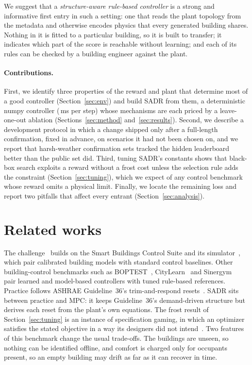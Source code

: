 \documentclass{article}
\begin{document}
We suggest that a \emph{structure-aware rule-based controller} is a strong and informative first entry in such a setting: one that reads the plant topology from the metadata and otherwise encodes physics that every generated building shares. Nothing in it is fitted to a particular building, so it is built to transfer; it indicates which part of the score is reachable without learning; and each of its rules can be checked by a building engineer against the plant.

\paragraph{Contributions.} First, we identify three properties of the reward and plant that determine most of a good controller (Section~\ref{sec:env}) and build SADR from them, a deterministic numpy controller (\PolicyMsOurs{}\,ms per step) whose mechanisms are each priced by a leave-one-out ablation (Sections~\ref{sec:method} and~\ref{sec:results}). Second, we describe a development protocol in which a change shipped only after a full-length confirmation, fixed in advance, on scenarios it had not been chosen on, and we report that harsh-weather confirmation sets tracked the hidden leaderboard better than the public set did. Third, tuning SADR's constants shows that black-box search exploits a reward without a frost cost unless the selection rule adds the constraint (Section~\ref{sec:tuning}), which we expect of any control benchmark whose reward omits a physical limit. Finally, we locate the remaining loss and report two pitfalls that affect every entrant (Section~\ref{sec:analysis}).

\section{Related works}
\label{sec:related}

The challenge~\citep{goldfeder2026smart} builds on the Smart Buildings Control Suite and its simulator~\citep{goldfeder2025suite,goldfeder2023lightweight}, which pair calibrated building models with standard control baselines. Other building-control benchmarks such as BOPTEST~\citep{blum2021boptest}, CityLearn~\citep{vazquezcanteli2019citylearn} and Sinergym~\citep{jimenezraboso2021sinergym} pair learned and model-based controllers with tuned rule-based references. Practice follows ASHRAE Guideline~36's trim-and-respond resets~\citep{ashrae2021g36,taylor2018vav}. SADR sits between practice and MPC: it keeps Guideline~36's demand-driven structure but derives each reset from the plant's own equations. The frost result of Section~\ref{sec:tuning} is an instance of specification gaming, in which an optimizer satisfies the stated objective in a way its designers did not intend~\citep{amodei2016concrete}. Two features of this benchmark change the usual trade-offs. The buildings are unseen, so nothing can be identified offline, and comfort is charged only for occupants present, so an empty building may drift as far as it can recover in time.
\end{document}
